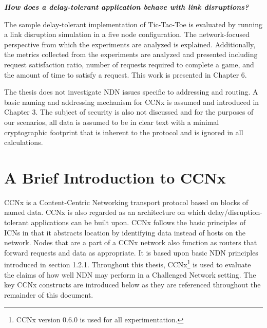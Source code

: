 \documentclass[a4paper,12pt]{report}      %
\begin{document}
\vspace{1em}
\noindent\textsl{\textbf{How does a delay-tolerant application behave with link disruptions?}} \par
The sample delay-tolerant implementation of Tic-Tac-Toe is evaluated by running a link disruption simulation 
in a five node configuration. The network-focused perspective from which the experiments are analyzed is explained.
Additionally, the metrics collected from the experiments are analyzed and presented including request satisfaction ratio, 
number of requests required to complete a game, and the amount of time to satisfy a request. This work is presented in Chapter 6.

The thesis does not investigate NDN issues specific to addressing and routing. A basic naming and
addressing mechanism for CCNx is assumed and introduced in Chapter 3. The subject of security is
also not discussed and for the purposes of our scenarios, all data is assumed to be in clear text with a
minimal cryptographic footprint that is inherent to the protocol and is ignored in all calculations.

\pagebreak
\chapter{A Brief Introduction to CCNx}
CCNx is a Content-Centric Networking transport protocol based on blocks of named data\cite{CCNxproto}. CCNx is also regarded as an architecture on which delay/disruption-tolerant applications can be built upon. CCNx follows the basic principles of ICNs in that it abstracts location by identifying data instead of hosts on the network. Nodes that are a part of a CCNx network also function as routers that forward requests and data as appropriate. It is based upon basic NDN principles introduced in section 1.2.1. Throughout this thesis, CCNx\footnote{CCNx version 0.6.0 is used for all experimentation.} is used to evaluate the claims of how well NDN may perform in a Challenged Network setting. The key CCNx constructs are introduced below as they are referenced throughout the remainder of this document\cite{CCNxproto}.
\end{document}
